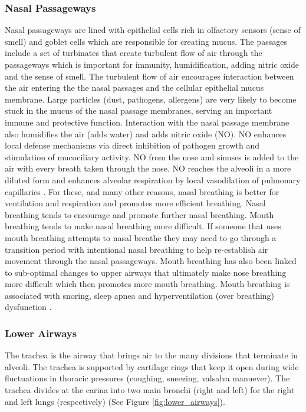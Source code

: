 \subsubsection{Nasal Passageways} 
Nasal passageways are lined with epithelial cells rich in olfactory sensors (sense of smell) and goblet cells which are responsible for creating mucus. The passages include a set of turbinates that create turbulent flow of air through the passageways which is important for immunity, humidification, adding nitric oxide and the sense of smell. The turbulent flow of air encourages interaction between the air entering the the nasal passages and the cellular epithelial mucus membrane. Large particles (dust, pathogens, allergens) are very likely to become stuck in the mucus of the nasal passage membranes, serving an important immune and protective function. Interaction with the nasal passage membrane also humidifies the air (adds water) and adds nitric oxide (NO). NO enhances local defense mechanisms via direct inhibition of pathogen growth and stimulation of mucociliary activity. NO from the nose and sinuses is added to the air with every breath taken through the nose. NO reaches the alveoli in a more diluted form and enhances alveolar respiration by local vasodilation of pulmonary capillaries \cite{tornberg_nasal_2002, lundberg_nitric_2008}. For these, and many other reasons, nasal breathing is better for ventilation and respiration and promotes more efficient breathing. Nasal breathing tends to encourage and promote further nasal breathing. Mouth breathing tends to make nasal breathing more difficult. If someone that uses mouth breathing attempts to nasal breathe they may need to go through a transition period with intentional nasal breathing to help re-establish air movement through the nasal passageways. Mouth breathing has also been linked to sub-optimal changes to upper airways that ultimately make nose breathing more difficult which then promotes more mouth breathing. Mouth breathing is associated with snoring, sleep apnea and hyperventilation (over breathing) dysfunction \cite{gilbert_recognizing_2014}.

\subsubsection{Lower Airways}
The trachea is the airway that brings air to the many divisions that terminate in alveoli. The trachea is supported by cartilage rings that keep it open during wide fluctuations in thoracic pressures (coughing, sneezing, valsalva manuever\footnotemark{}). The trachea divides at the carina into two main bronchi (right and left) for the right and left lungs (respectively) (See Figure \ref{fig:lower_airways}). 

